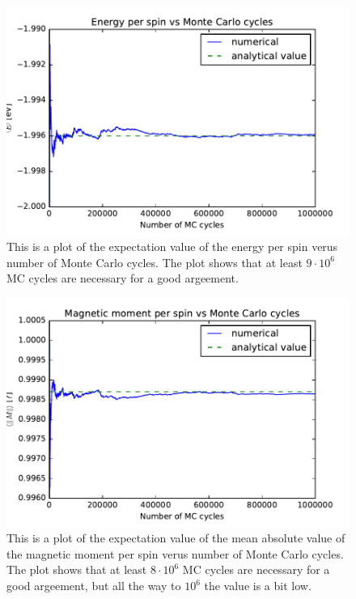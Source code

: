
\begin{figure}[H]
\includegraphics[width=\linewidth]{../results/4b/N_2_energy}\caption{This is a plot of the expectation value of the energy per spin verus number of Monte Carlo cycles. The plot shows that at least $ 9 \cdot 10^{6} $ MC cycles are necessary for a good argeement.}\label{fig:L_2_energy}
\end{figure}

\begin{figure}[H]
\includegraphics[width=\linewidth]{../results/4b/N_2_magnetic_abs}\caption{This is a plot of the expectation value of the mean absolute value of the magnetic moment per spin verus number of Monte Carlo cycles. The plot shows that at least $ 8 \cdot 10^{6} $ MC cycles are necessary for a good argeement, but all the way to $10^6$ the value is a bit low.}\label{fig:L_2_magnetic_abs}
\end{figure}

